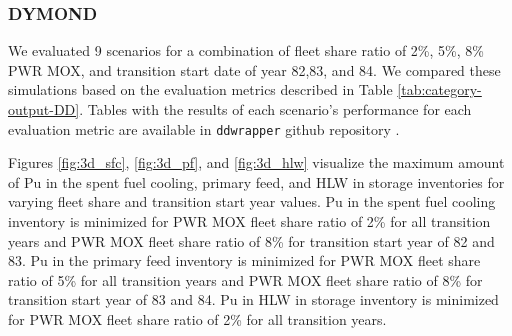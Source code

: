 \subsubsection{\textbf{DYMOND}}
We evaluated 9 scenarios for a combination of fleet share ratio of 
2\%, 5\%, 8\% PWR MOX, and transition start date of year 82,83, and 84.
We compared these simulations based on the evaluation 
metrics described in Table \ref{tab:category-output-DD}.
Tables with the results of each scenario's performance 
for each evaluation metric are available in  \texttt{ddwrapper} github repository 
\cite{chee_gwenchee/ddwrapper_2019}. 

Figures \ref{fig:3d_sfc}, \ref{fig:3d_pf}, and \ref{fig:3d_hlw}
visualize the maximum amount of Pu in the spent fuel cooling, 
primary feed, and \gls{HLW} in storage inventories for varying 
fleet share and transition start year values. 
Pu in the spent fuel cooling inventory is minimized for PWR MOX
fleet share ratio of 2\% for all transition years
and PWR MOX fleet share ratio of 8\% for 
transition start year of 82 and 83.  
Pu in the primary feed inventory is minimized for PWR MOX
fleet share ratio of 5\% for all transition years and PWR MOX 
fleet share ratio of 8\% for 
transition start year of 83 and 84.                       
Pu in HLW in storage inventory is minimized for PWR MOX
fleet share ratio of 2\% for all transition years. 

